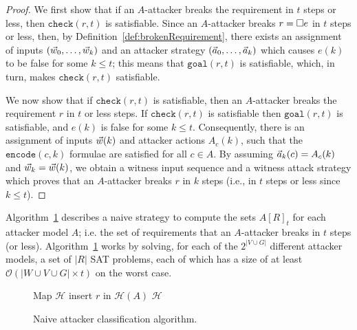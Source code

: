 \begin{proof}
We first show that if an $A$-attacker breaks the requirement in $t$ steps or less, then $\mathtt{check}(r,t)$ is satisfiable. Since an $A$-attacker breaks $r={{\square}} e$ in $t$ steps or less, then, by Definition~\ref{def:brokenRequirement}, there exists an assignment of inputs $(\vec{w}_0, \ldots, \vec{w}_k)$ and an attacker strategy $(\vec{a}_0, \ldots, \vec{a}_k)$ which causes $e(k)$ to be false for some $k\leq t$; this means that $\mathtt{goal}(r,t)$ is satisfiable, which, in turn, makes $\mathtt{check}(r,t)$ satisfiable.

We now show that if $\mathtt{check}(r,t)$ is satisfiable, then an $A$-attacker breaks the requirement $r$ in $t$ or less steps. If $\mathtt{check}(r,t)$ is satisfiable then $\mathtt{goal}(r,t)$ is satisfiable, and $e(k)$ is false for some $k\leq t$. Consequently, there is an assignment of inputs $\vec{w}(k)$ and attacker actions $A_c(k)$, such that the $\mathtt{encode}(c,k)$ formulae are satisfied for all $c\in A$. By assuming $\vec{a}_k(c)=A_c(k)$ and $\vec{w}_k =\vec{w}(k)$, we obtain a witness input sequence and a witness attack strategy which proves that an $A$-attacker breaks $r$ in $k$ steps (i.e., in $t$ steps or less since $k\leq t$).
\end{proof}

Algorithm~\ref{alg:BadQuantification} describes a naive strategy to compute the sets $A[R]_t$ for each attacker model $A$; i.e. the set of requirements that an $A$-attacker breaks in $t$ steps (or less). Algorithm~\ref{alg:BadQuantification} works by solving, for each of the $2^{|V \cup G|}$ different attacker models, a set of $|R|$ SAT problems, 
{
each of which has a size of at least $\mathcal{O}\left({|W\cup V\cup G|\times t}\right)$ on the worst case.}

\begin{figure}[!t]
\centering
{
\begin{algorithm}[H]
Map $\mathcal{H}$\;
{
	{
		{
			insert $r$ in $\mathcal{H}(A)$\;
		}
	 }
}
 \Return $\mathcal{H}$\;
 \caption{Naive attacker classification algorithm.}
 \label{alg:BadQuantification}
\end{algorithm}
}
\end{figure}

